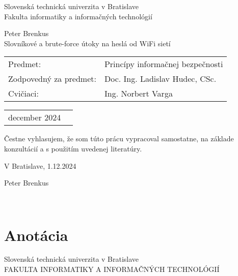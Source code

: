 \documentclass[12pt, twoside]{book}
\def\mfrok{december 2024}
\def\mfnazov{Slovn\'{i}kov\'{e} a brute-force \'{u}toky na  hesl\'{a} od WiFi siet\'{i}}
\def\mfautor{Peter Brenkus}
\def\mfveduci{Ing. Norbert Varga}
\def\mfpredmet{Princ\'{i}py informa\v{c}nej bezpe\v{c}nosti}
\def\mfgarant{Doc. Ing. Ladislav Hudec, CSc.}
\begin{document}
 
   
\frontmatter





\noindent

\begin{center}
\sc  
\large

Slovenská technická univerzita v Bratislave\\
Fakulta informatiky a informačných technológií\\
\bigskip

\vfill

\mfautor\\
\bigskip
{\mfnazov}\\
\end{center}

\vfill

\noindent
\begin{tabular}{@{}ll}
Predmet: & \mfpredmet \\
Zodpovedný za predmet: & \mfgarant \\
Cvičiaci: & \mfveduci \\
\end{tabular}

\bigskip



\noindent
\begin{tabular}{@{}ll}
\mfrok\\
\end{tabular}


\newpage
\thispagestyle{empty}
\vspace*{20cm}
\noindent
Čestne vyhlasujem, že som túto prácu vypracoval samostatne, na základe konzultácií a s použitím uvedenej literatúry.

\bigskip
\bigskip
\noindent
V Bratislave, 1.12.2024

{\raggedleft Peter Brenkus\quad \par}
\bigskip

~

\vfill
\noindent

\newpage 

\section*{Anotácia}
\noindent
Slovenská technická univerzita v Bratislave\\
FAKULTA INFORMATIKY A INFORMAČNÝCH TECHNOLÓGIÍ\\
\end{document}
